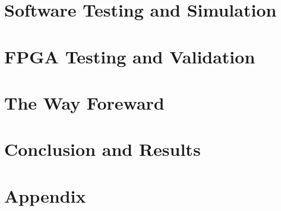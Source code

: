 \documentclass[12pt,a4paper]{report}
\begin{document}
\chapter{Software Testing and Simulation}
\chapter{FPGA Testing and Validation}
\chapter{The Way Foreward}
\chapter{Conclusion and Results}
\chapter{Appendix}
\end{document}
